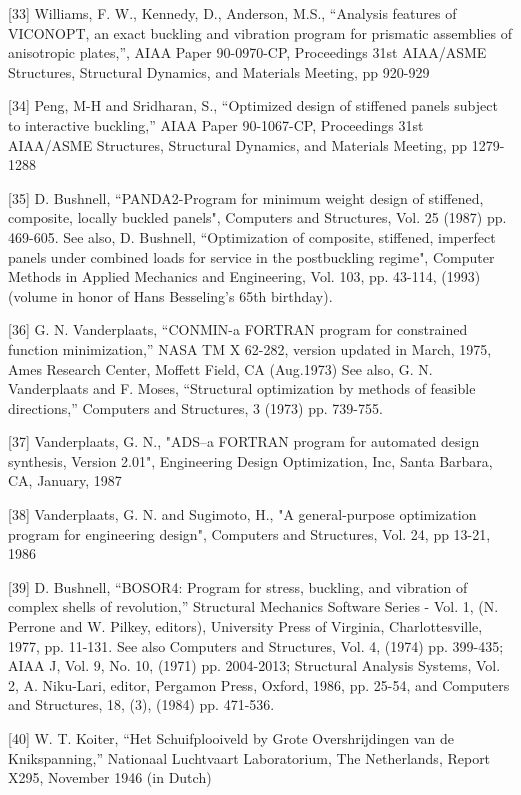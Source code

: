 [33] Williams, F. W., Kennedy, D., Anderson, M.S., ``Analysis features
of VICONOPT, an exact buckling and vibration program for prismatic
assemblies of anisotropic plates,'', AIAA Paper 90-0970-CP,
Proceedings 31st AIAA/ASME Structures, Structural Dynamics,
and Materials Meeting, pp 920-929

[34] Peng, M-H and Sridharan, S., ``Optimized design of stiffened
panels subject to interactive buckling,'' AIAA Paper 90-1067-CP,
Proceedings 31st AIAA/ASME Structures, Structural Dynamics, and
Materials Meeting, pp 1279-1288 

[35] D. Bushnell, ``PANDA2-Program for minimum weight design of
stiffened, composite, locally buckled panels", Computers and
Structures, Vol. 25 (1987) pp. 469-605. See also, D. Bushnell,
``Optimization of composite, stiffened, imperfect panels under
combined loads for service in the postbuckling regime", Computer
Methods in Applied Mechanics and Engineering, Vol. 103, pp. 43-114,
(1993) (volume in honor of Hans Besseling's 65th birthday).

[36] G. N. Vanderplaats, ``CONMIN-a FORTRAN program for constrained
function minimization,'' NASA TM X 62-282, version updated in March,
1975, Ames Research Center, Moffett Field, CA (Aug.1973) See also, G.
N. Vanderplaats and F. Moses, ``Structural optimization by methods of
feasible directions,'' Computers and Structures, 3 (1973) pp.
739-755. 

[37] Vanderplaats, G. N., "ADS--a FORTRAN program for automated
design synthesis, Version 2.01", Engineering Design Optimization,
Inc, Santa Barbara, CA, January, 1987 

[38] Vanderplaats, G. N. and Sugimoto, H., "A general-purpose
optimization program for engineering design", Computers and
Structures, Vol. 24, pp 13-21, 1986 
 
[39] D. Bushnell, ``BOSOR4: Program for stress, buckling, and
vibration of complex shells of revolution,'' Structural Mechanics
Software Series - Vol. 1, (N. Perrone and W. Pilkey, editors),
University Press of Virginia, Charlottesville, 1977, pp. 11-131. See
also Computers and Structures, Vol. 4, (1974) pp. 399-435;  AIAA J,
Vol. 9, No. 10, (1971) pp. 2004-2013; Structural Analysis Systems,
Vol. 2, A. Niku-Lari, editor, Pergamon Press, Oxford, 1986, pp.
25-54, and Computers and Structures, 18, (3), (1984) pp. 471-536. 
 
[40] W. T. Koiter, ``Het Schuifplooiveld by Grote Overshrijdingen van
de Knikspanning,'' Nationaal Luchtvaart Laboratorium, The
Netherlands, Report X295, November 1946 (in Dutch) 

